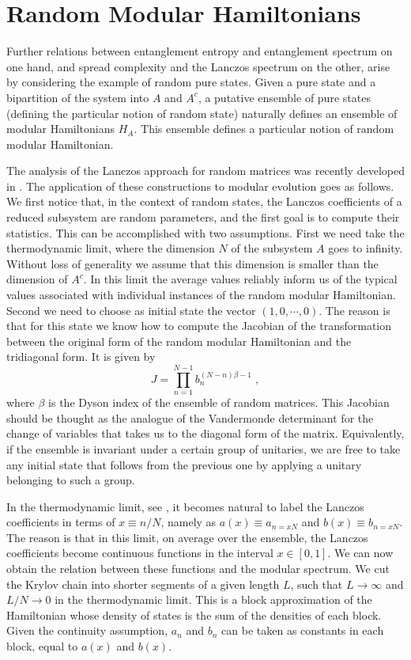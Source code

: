 \documentclass[aps,prl,twocolumn,showpacs,preprintnumbers,amsmath,amssymb]{revtex4-1}
\def\be{\begin{equation}}
\def\ee{\end{equation}}
\begin{document}
\section{Random Modular Hamiltonians}
Further relations between entanglement entropy and entanglement spectrum on one hand, and spread complexity and the Lanczos spectrum on the other, arise by considering the example of random pure states. Given a pure state and a bipartition of the system into $A$ and $A^c$, a putative ensemble of pure states (defining the particular notion of random state) naturally defines an ensemble of modular Hamiltonians $H_A$. This ensemble defines a particular notion of random modular Hamiltonian.

The analysis of the Lanczos approach for random matrices was recently developed in \cite{Balasubramanian:2022dnj,usrandom2}. The application of these constructions to modular evolution goes as follows. We first notice that, in the context of random states, the Lanczos coefficients of a reduced subsystem are random parameters, and the first goal is to compute their statistics. This can be accomplished with two assumptions. First we need take the thermodynamic limit, where the dimension $N$ of the subsystem $A$ goes to infinity. Without loss of generality we assume that this dimension is smaller than the dimension of $A^c$. In this limit the average values reliably inform us of the typical values associated with individual instances of the random modular Hamiltonian. Second we need to choose as initial state the vector $(1,0,\cdots, 0)$. The reason is that for this state we know how to compute the Jacobian of the transformation between the original form of the random modular Hamiltonian and the tridiagonal form. It is given by \cite{Balasubramanian:2022dnj}
\be
J=\prod\limits_{n=1}^{N-1} b_n^{(N-n)\beta-1}\;,
\ee
where $\beta$ is the Dyson index of the ensemble of random matrices. This Jacobian should be thought as the analogue of the Vandermonde determinant for the change of variables that takes us to the diagonal form of the matrix. Equivalently, if the ensemble is invariant under a certain group of unitaries, we are free to take any initial state that follows from the previous one by applying a unitary belonging to such a group.

In the thermodynamic limit, see \cite{PhysRevD.47.1640,doi:10.1063/1.533010,Balasubramanian:2022dnj,usrandom2}, it becomes natural to label the Lanczos coefficients in terms of $x\equiv n/N$, namely as $a(x)\equiv a_{n=xN}$ and $b(x)\equiv b_{n=xN}$. The reason is that in this limit, on average over the ensemble, the Lanczos coefficients become continuous functions in the interval $x\in [0,1]$. We can now obtain the relation between these functions and the modular spectrum. We cut the Krylov chain into shorter segments of a given length $L$, such that $L\rightarrow\infty$ and $L/N\rightarrow 0$ in the thermodynamic limit. This is a block approximation of the Hamiltonian whose density of states is the sum of the densities of each block. Given the continuity assumption, $a_n$ and $b_n$ can be taken as constants in each block, equal to $a(x)$ and $b(x)$. 
\end{document}
